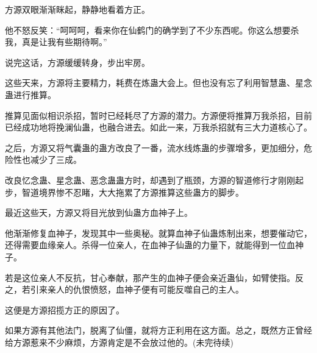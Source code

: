 \begin{this_body}
方源双眼渐渐眯起，静静地看着方正。

他不怒反笑：“呵呵呵，看来你在仙鹤门的确学到了不少东西呢。你这么想要杀我，真是让我有些期待啊。”

说完这话，方源缓缓转身，步出牢房。

这些天来，方源将主要精力，耗费在炼蛊大会上。但也没有忘了利用智慧蛊、星念蛊进行推算。

推算见面似相识杀招，暂时已经耗尽了方源的潜力。方源便将推算万我杀招，目前已经成功地将挽澜仙蛊，也融合进去。如此一来，万我杀招就有三大力道核心了。

之后，方源又将气囊蛊的蛊方改良了一番，流水线炼蛊的步骤增多，更加细分，危险性也减少了三成。

改良忆念蛊、星念蛊、恶念蛊蛊方时，却遇到了瓶颈，方源的智道修行才刚刚起步，智道境界惨不忍睹，大大拖累了方源推算这些蛊方的脚步。

最近这些天，方源又将目光放到仙蛊方血神子上。

他渐渐修复血神子，发现其中一些奥秘。就算血神子仙蛊炼制出来，想要催动它，还得需要血缘亲人。杀得一位亲人，在血神子仙蛊的力量下，就能得到一位血神子。

若是这位亲人不反抗，甘心奉献，那产生的血神子便会亲近蛊仙，如臂使指。反之，若引来亲人的仇恨愤怒，血神子便有可能反噬自己的主人。

这便是方源招揽方正的原因了。

如果方源有其他法门，脱离了仙僵，就将方正利用在这方面。总之，既然方正曾经给方源惹来不少麻烦，方源肯定是不会放过他的。(未完待续)

\end{this_body}

